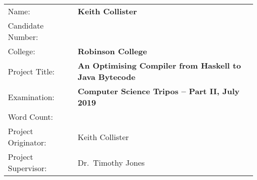 \documentclass[dissertation.tex]{subfiles}
\begin{document}
{\large
\begin{tabular}{ll}
Name:               & \textbf{Keith Collister} \\
Candidate Number:   & \textbf{} \\
College:            & \textbf{Robinson College} \\
Project Title:      & \textbf{An Optimising Compiler from Haskell to Java Bytecode} \\
Examination:        & \textbf{Computer Science Tripos -- Part II, July 2019} \\
Word Count:         & \textbf{} \\
Project Originator: & Keith Collister \\
Project Supervisor: & Dr.\ Timothy Jones \\ 
\end{tabular}
}
\end{document}

